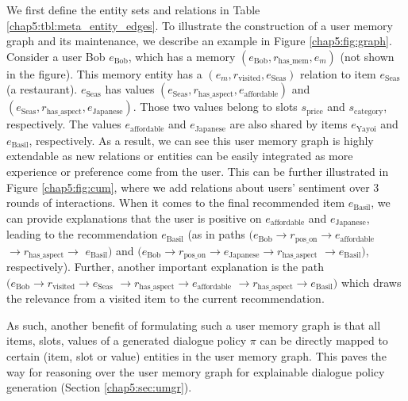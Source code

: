 We first define the entity sets and relations in Table \ref{chap5:tbl:meta_entity_edges}.
To illustrate the construction of a user memory graph and its maintenance, we describe an example in Figure \ref{chap5:fig:graph}.
Consider a user Bob $e_\text{Bob}$, which has a memory $(e_\text{Bob}, r_{\text{has\_mem}}, e_m)$ (not shown in the figure).
This memory entity has a $(e_m, r_{\text{visited}}, e_\text{Seas})$ relation to item $e_\text{Seas}$ (a restaurant).
$e_\text{Seas}$ has values $(e_\text{Seas}, r_{\text{has\_aspect}}, e_\text{affordable})$ and $(e_\text{Seas}, r_{\text{has\_aspect}}, e_\text{Japanese})$.
Those two values belong to slots $s_\text{price}$ and $s_\text{category}$, respectively.
The values $e_\text{affordable}$ and $e_\text{Japanese}$ are also shared by items $e_\text{Yayoi}$ and $e_\text{Basil}$, respectively.
As a result, we can see this user memory graph is highly extendable as new relations or entities can be easily integrated as more experience or preference come from the user. This can be further illustrated in Figure \ref{chap5:fig:cum}, where we add relations about users' sentiment over 3 rounds of interactions.
When it comes to the final recommended item $e_{\text{Basil}}$, we can provide explanations that the user is positive on $e_\text{affordable}$ and $e_\text{Japanese}$, leading to the recommendation $e_\text{Basil}$ (as in paths $(e_\text{Bob} \rightarrow r_\text{pos\_on} \rightarrow e_\text{affordable}$ $\rightarrow r_\text{has\_aspect} \rightarrow$ $e_\text{Basil})$ and $(e_\text{Bob} \rightarrow r_\text{pos\_on} \rightarrow e_\text{Japanese} \rightarrow r_\text{has\_aspect} $ $\rightarrow e_\text{Basil})$, respectively). Further, another important explanation is the path $(e_\text{Bob} \rightarrow r_\text{visited} \rightarrow e_\text{Seas}$ $\rightarrow r_\text{has\_aspect} \rightarrow e_\text{affordable}$ $\rightarrow r_\text{has\_aspect} \rightarrow e_\text{Basil})$ which draws the relevance from a visited item to the current recommendation. 

As such, another benefit of formulating such a user memory graph is that all items, slots, values of a generated dialogue policy $\pi$ can be directly mapped to certain (item, slot or value) entities in the user memory graph.
This paves the way for reasoning over the user memory graph for explainable dialogue policy generation (Section \ref{chap5:sec:umgr}). 


